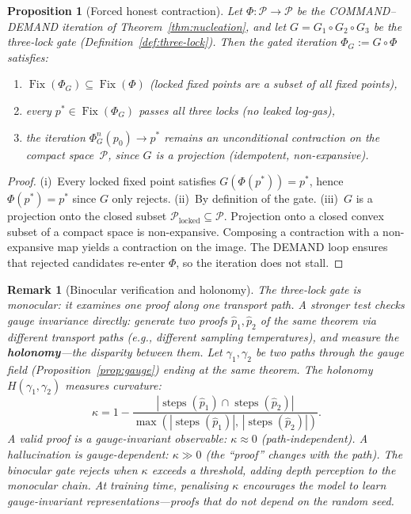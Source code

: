 \documentclass[11pt,a4paper]{article}
\newtheorem{proposition}[theorem]{Proposition}
\newtheorem{remark}[theorem]{Remark}
\newcommand{\cP}{\mathcal{P}}
\begin{document}
\begin{proposition}[Forced honest contraction]\label{prop:honest}
Let $\Phi\colon \cP \to \cP$ be the
COMMAND--DEMAND iteration of Theorem~\ref{thm:nucleation},
and let $G = G_1 \circ G_2 \circ G_3$ be the three-lock gate
(Definition~\ref{def:three-lock}).
Then the gated iteration $\Phi_G := G \circ \Phi$ satisfies:
\begin{enumerate}[label=(\roman*),nosep]
\item $\operatorname{Fix}(\Phi_G) \subseteq \operatorname{Fix}(\Phi)$
  (locked fixed points are a subset of all fixed points),
\item every $p^* \in \operatorname{Fix}(\Phi_G)$ passes all three
  locks (no leaked log-gas),
\item the iteration $\Phi_G^n(p_0) \to p^*$ remains an
  unconditional contraction on the compact space~$\cP$,
  since $G$ is a projection (idempotent, non-expansive).
\end{enumerate}
\end{proposition}

\begin{proof}
(i)~Every locked fixed point satisfies $G(\Phi(p^*)) = p^*$,
hence $\Phi(p^*) = p^*$ since $G$ only rejects.
(ii)~By definition of the gate.
(iii)~$G$ is a projection onto the closed subset
$\cP_{\mathrm{locked}} \subseteq \cP$.
Projection onto a closed convex subset of a compact space is
non-expansive.  Composing a contraction with a non-expansive map
yields a contraction on the image.
The DEMAND loop ensures that rejected candidates re-enter $\Phi$,
so the iteration does not stall.
\end{proof}

\begin{remark}[Binocular verification and holonomy]\label{rem:binocular}
The three-lock gate is \emph{monocular}: it examines one proof along
one transport path.
A stronger test checks \emph{gauge invariance} directly:
generate two proofs $\hat{p}_1, \hat{p}_2$ of the same theorem
via different transport paths (e.g., different sampling temperatures),
and measure the \textbf{holonomy}---the disparity between them.
Let $\gamma_1, \gamma_2$ be two paths through the gauge field
(Proposition~\ref{prop:gauge}) ending at the same theorem.
The holonomy $H(\gamma_1, \gamma_2)$ measures curvature:
\[
  \kappa = 1 - \frac{|\operatorname{steps}(\hat{p}_1)
    \cap \operatorname{steps}(\hat{p}_2)|}
    {\max(|\operatorname{steps}(\hat{p}_1)|,\,
    |\operatorname{steps}(\hat{p}_2)|)}.
\]
A valid proof is a gauge-invariant observable: $\kappa \approx 0$
(path-independent).
A hallucination is gauge-dependent: $\kappa \gg 0$
(the ``proof'' changes with the path).
The binocular gate rejects when $\kappa$ exceeds a threshold,
adding depth perception to the monocular chain.
At training time, penalising $\kappa$ encourages the model to learn
gauge-invariant representations---proofs that do not depend on the
random seed.
\end{remark}
\end{document}
